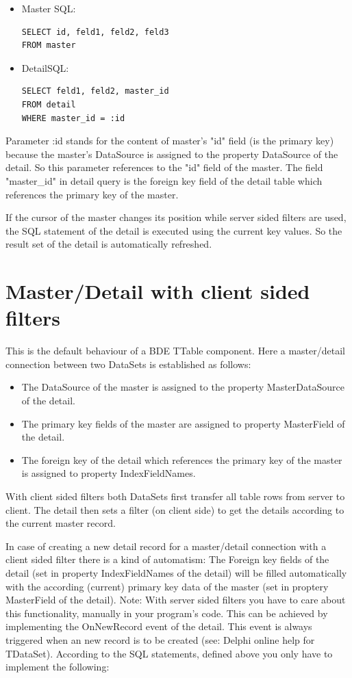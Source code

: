 \documentclass[a4paper,12pt,oneside]{book}
\begin{document}
\begin{itemize}
  \item Master SQL:
	  \begin{verbatim}
SELECT id, feld1, feld2, feld3
FROM master
    \end{verbatim}
  \item DetailSQL:
	  \begin{verbatim}
SELECT feld1, feld2, master_id
FROM detail
WHERE master_id = :id
    \end{verbatim}
\end{itemize}

Parameter :id stands for the content of master's "id" field (is the primary key) because the master's DataSource is assigned to the property DataSource of the detail.
So this parameter references to the "id" field of the master.
The field "master\_id" in detail query is the foreign key field of the detail table which references the primary key of the master.

If the cursor of the master changes its position while server sided filters are used, the SQL statement of the detail is executed using the current key values.
So the result set of the detail is automatically refreshed.

\section{Master/Detail with client sided filters}
This is the default behaviour of a BDE TTable component. Here a master/detail connection between two DataSets is established as follows:

\begin{itemize}
  \item The DataSource of the master is assigned to the property MasterDataSource of the detail.
  \item The primary key fields of the master are assigned to property MasterField of the detail.
  \item The foreign key of the detail which references the primary key of the master is assigned to property IndexFieldNames.
\end{itemize}

With client sided filters both DataSets first transfer all table rows from server to client.
The detail then sets a filter (on client side) to get the details according to the current master record.

In case of creating a new detail record for a master/detail connection with a client sided filter there is a kind of automatism:
The Foreign key fields of the detail (set in property IndexFieldNames of the detail) will be filled automatically with the according (current) primary key data of the master (set in proptery MasterField of the detail).
Note: With server sided filters you have to care about this functionality, manually in your program's code.
This can be achieved by implementing the OnNewRecord event of the detail.
This event is always triggered when an new record is to be created (see: Delphi online help for TDataSet).
According to the SQL statements, defined above you only have to implement the following:
\end{document}
